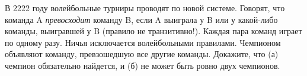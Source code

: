 \documentclass{article}
\begin{document}
В 2222 году волейбольные турниры проводят по новой системе. Говорят, что команда A \textit{превосходит} команду B, если A выиграла
у B или у какой-либо команды, выигравшей у B (правило не транзитивно!). Каждая пара команд играет по одному разу. Ничья исключается волейбольными правилами. Чемпионом объявляют команду,
превзошедшую все другие команды. Докажите, что (а) чемпион обязательно найдется, и (б) не может быть ровно двух чемпионов.
\end{document}
